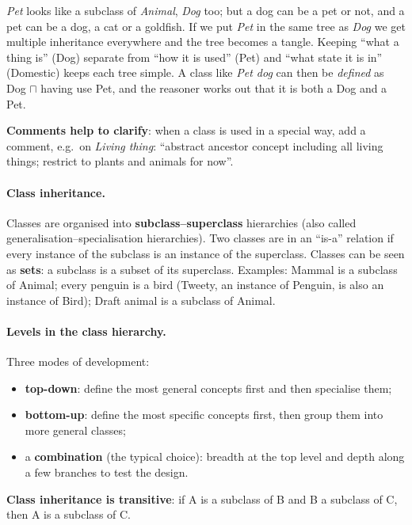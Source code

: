 \begin{nbintuition}
\emph{Pet} looks like a subclass of \emph{Animal}, \emph{Dog} too; but a dog can be a
pet or not, and a pet can be a dog, a cat or a goldfish. If we put \emph{Pet} in the
same tree as \emph{Dog} we get multiple inheritance everywhere and the tree becomes a
tangle. Keeping ``what a thing is'' (Dog) separate from ``how it is used'' (Pet) and
``what state it is in'' (Domestic) keeps each tree simple. A class like \emph{Pet dog}
can then be \emph{defined} as Dog $\sqcap$ having use Pet, and the reasoner works out
that it is both a Dog and a Pet.
\end{nbintuition}

\textbf{Comments help to clarify}: when a class is used in a special way, add a comment,
e.g.\ on \emph{Living thing}: ``abstract ancestor concept including all living things;
restrict to plants and animals for now''.

\paragraph{Class inheritance.}
Classes are organised into \textbf{subclass--superclass} hierarchies (also called
generalisation--specialisation hierarchies). Two classes are in an ``is-a'' relation if every instance of the subclass
is an instance of the superclass. Classes can be seen as \textbf{sets}: a subclass is a
subset of its superclass. Examples: Mammal is a subclass of Animal; every penguin is a
bird (Tweety, an instance of Penguin, is also an instance of Bird); Draft animal is a
subclass of Animal.

\paragraph{Levels in the class hierarchy.}
Three modes of development:
\begin{itemize}[nosep]
  \item \textbf{top-down}: define the most general concepts first and then specialise
        them;
  \item \textbf{bottom-up}: define the most specific concepts first, then group them into
        more general classes;
  \item a \textbf{combination} (the typical choice): breadth at the top level and depth
        along a few branches to test the design.
\end{itemize}
\textbf{Class inheritance is transitive}: if A is a subclass of B and B a subclass of C,
then A is a subclass of C.

